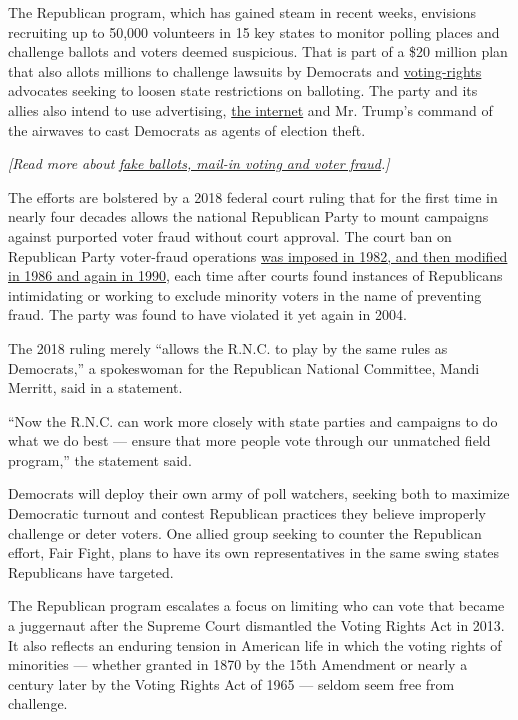 The Republican program, which has gained steam in recent weeks,
envisions recruiting up to 50,000 volunteers in 15 key states to monitor
polling places and challenge ballots and voters deemed suspicious. That
is part of a \$20 million plan that also allots millions to challenge
lawsuits by Democrats and
\href{https://www.nytimes.com/2020/07/18/us/supreme-court-voting-rights.html}{voting-rights}
advocates seeking to loosen state restrictions on balloting. The party
and its allies also intend to use advertising,
\href{https://protectthevote.com/?utm_medium=email\&utm_source=pu_48\&utm_campaign=20200508_123842_\&utm_content=\&_ga=2.58845101.124784289.1588967538-1349174632.1588967538}{the
internet} and Mr. Trump's command of the airwaves to cast Democrats as
agents of election theft.

\emph{{[}Read more about}
\href{https://www.nytimes.com/article/mail-in-vote-fraud-ballot.html}{\emph{fake
ballots, mail-in voting and voter fraud}}\emph{.{]}}

The efforts are bolstered by a 2018 federal court ruling that for the
first time in nearly four decades allows the national Republican Party
to mount campaigns against purported voter fraud without court approval.
The court ban on Republican Party voter-fraud operations
\href{https://www.theatlantic.com/politics/archive/2018/01/the-gop-just-received-another-tool-for-suppressing-votes/550052/}{was
imposed in 1982, and then modified in 1986 and again in 1990,} each time
after courts found instances of Republicans intimidating or working to
exclude minority voters in the name of preventing fraud. The party was
found to have violated it yet again in 2004.

The 2018 ruling merely ``allows the R.N.C. to play by the same rules as
Democrats,'' a spokeswoman for the Republican National Committee, Mandi
Merritt, said in a statement.

``Now the R.N.C. can work more closely with state parties and campaigns
to do what we do best --- ensure that more people vote through our
unmatched field program,'' the statement said.

Democrats will deploy their own army of poll watchers, seeking both to
maximize Democratic turnout and contest Republican practices they
believe improperly challenge or deter voters. One allied group seeking
to counter the Republican effort, Fair Fight, plans to have its own
representatives in the same swing states Republicans have targeted.

The Republican program escalates a focus on limiting who can vote that
became a juggernaut after the Supreme Court dismantled the Voting Rights
Act in 2013. It also reflects an enduring tension in American life in
which the voting rights of minorities --- whether granted in 1870 by the
15th Amendment or nearly a century later by the Voting Rights Act of
1965 --- seldom seem free from challenge.

